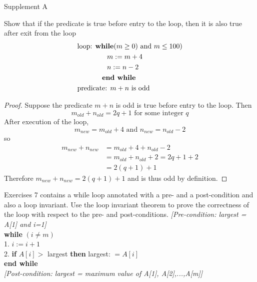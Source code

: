 \documentclass[12pt,letterpaper, onecolumn]{exam}
\begin{document}
	\centering\large Supplement A\\
\begin{questions}
	\setcounter{question}{1} \question Show that if the predicate is true before entry to the loop, then it is also true after exit from the loop
		\begin{align*}
		&\textrm{loop: }\textbf{while}(m\geq0)\textrm{ and }m\leq100)\\
		&\hspace*{1.5cm}m:=m+4\\
		&\hspace*{1.5cm}n:=n-2\\
		&\hspace*{1.25cm}\textbf{end while}\\
		&\textrm{predicate: }m+n \textrm{ is odd}\\
	\end{align*}
	\begin{solution}
		\begin{proof}
		Suppose the predicate $m+n$ is odd is true before entry to the loop. Then
		$$m_{old}+n_{old}=2q+1 \textrm{ for some integer $q$}$$
		After execution of the loop,
		$$m_{new}=m_{old}+4 \textrm{ and } n_{new}=n_{old}-2$$
		so
		\begin{align*}
		m_{new}+n_{new}&=m_{old}+4+n_{old}-2\\
		&=m_{old}+n_{old}+2=2q+1+2\\
		&=2(q+1)+1
		\end{align*}
		Therefore $m_{new}+n_{new}=2(q+1)+1$ and is thus odd by definition.
		\end{proof}
	\end{solution}
	Exercises 7 contains a while loop annotated with a pre- and a post-condition and also a loop invariant. Use the loop invariant theorem to prove the correctness of the loop with respect to the pre- and post-conditions.
	\setcounter{question}{6} \question \textit{[Pre-condition: largest = A[1] and i=1]}\\
	\hspace*{0.25cm} \textbf{while} $(i\neq m)$\\
	\hspace*{0.75cm} 1. $i:=i+1$\\
	\hspace*{0.75cm} 2. \textbf{if} $A[i]>$ largest \textbf{then} largest: $=A[i]$\\
	\hspace*{0.25cm} \textbf{end while}\\
	\textit{[Post-condition: largest = maximum value of A[1], A[2],...,A[m]]}\\

\end{questions}
\end{document}
